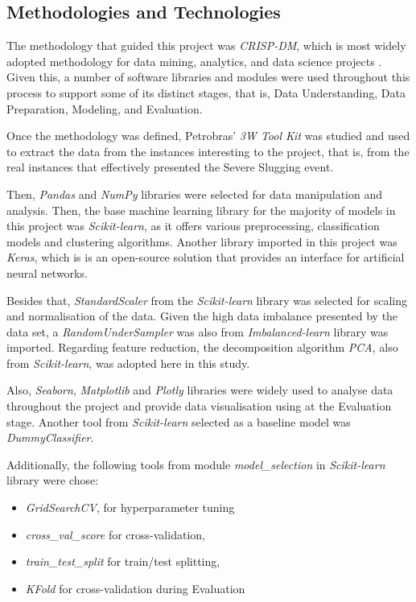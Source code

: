 \documentclass{article}
\begin{document}
\subsection{Methodologies and Technologies}

The methodology that guided this project was \emph{CRISP-DM}, which is most widely adopted methodology for data mining, analytics, and data science projects \parencite{ibm_crisp_dm}. Given this, a number of software libraries and modules were used throughout this process to support some of its distinct stages, that is, Data Understanding, Data Preparation, Modeling, and Evaluation. 

Once the methodology was defined, Petrobras' \emph{3W Tool Kit} was studied and used to extract the data from the instances interesting to the project, that is, from the real instances that effectively presented the Severe Slugging event.

Then, \emph{Pandas} and \emph{NumPy} libraries were selected for data manipulation and analysis. Then, the base machine learning library for the majority of models in this project was \emph{Scikit-learn}, as it offers various preprocessing, classification models and clustering algorithms. Another library imported in this project was \emph{Keras}, which is is an open-source solution that provides an interface for artificial neural networks.

Besides that, \emph{StandardScaler} from the \emph{Scikit-learn} library was selected for scaling and normalisation of the data. Given the high data imbalance presented by the data set, a \emph{RandomUnderSampler} was also from \emph{Imbalanced-learn} library was imported. Regarding feature reduction, the decomposition algorithm \emph{PCA}, also from \emph{Scikit-learn}, was adopted here in this study. 

Also, \emph{Seaborn}, \emph{Matplotlib} and \emph{Plotly} libraries were widely used to analyse data throughout the project and provide data visualisation using at the Evaluation stage. Another tool from \emph{Scikit-learn} selected as a baseline model was \emph{DummyClassifier}. 

Additionally, the following tools from module \emph{model\_selection} in \emph{Scikit-learn} library were chose:

\begin{itemize}
    \item \emph{GridSearchCV}, for hyperparameter tuning
    \item \emph{cross\_val\_score} for cross-validation, 
    \item \emph{train\_test\_split} for train/test splitting,
    \item \emph{KFold} for cross-validation during Evaluation
\end{itemize}
\end{document}
